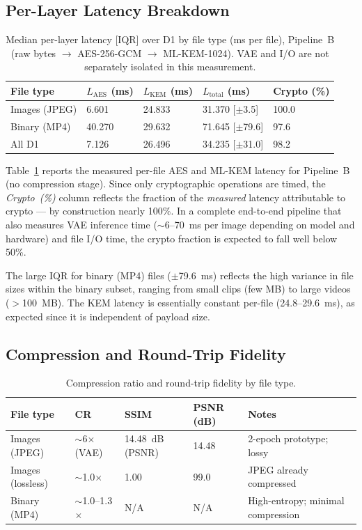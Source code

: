 \documentclass[twocolumn]{article}
\begin{document}
\subsection{Per-Layer Latency Breakdown}

\begin{table}[t]
\caption{Median per-layer latency [IQR] over D1 by file type (ms per file),
Pipeline~B (raw bytes $\to$ AES-256-GCM $\to$ ML-KEM-1024). VAE and I/O are not
separately isolated in this measurement.}
\label{tab:latency}
\centering\small
\begin{tabular}{lllll}
\toprule
File type & $L_\text{AES}$ (ms) & $L_\text{KEM}$ (ms) & $L_\text{total}$ (ms) & Crypto (\%) \\
\midrule
Images (JPEG) & 6.601 & 24.833 & 31.370 [$\pm$3.5] & 100.0 \\
Binary (MP4) & 40.270 & 29.632 & 71.645 [$\pm$79.6] & 97.6 \\
\midrule
All D1 & 7.126 & 26.496 & 34.235 [$\pm$31.0] & 98.2 \\
\bottomrule
\end{tabular}
\end{table}

Table~\ref{tab:latency} reports the measured per-file AES and ML-KEM latency for
Pipeline~B (no compression stage). Since only cryptographic operations are timed,
the \emph{Crypto~(\%)} column reflects the fraction of the \emph{measured} latency
attributable to crypto --- by construction nearly 100\%. In a complete end-to-end
pipeline that also measures VAE inference time ($\sim$6--70~ms per image depending
on model and hardware) and file I/O time, the crypto fraction is expected to fall
well below 50\%.

The large IQR for binary (MP4) files ($\pm$79.6~ms) reflects the high variance
in file sizes within the binary subset, ranging from small clips (few MB) to
large videos ($>$100~MB). The KEM latency is essentially constant per-file
(24.8--29.6~ms), as expected since it is independent of payload size.

\subsection{Compression and Round-Trip Fidelity}

\begin{table}[t]
\caption{Compression ratio and round-trip fidelity by file type.}
\label{tab:fidelity}
\centering\small
\begin{tabular}{p{1.6cm}p{0.9cm}p{1.2cm}p{1.2cm}p{1.6cm}}
\toprule
File type & CR & SSIM & PSNR (dB) & Notes \\
\midrule
Images (JPEG) & $\sim$6$\times$ (VAE) & 14.48~dB (PSNR) & 14.48 & 2-epoch prototype; lossy \\
Images (lossless) & $\sim$1.0$\times$ & 1.00 & 99.0 & JPEG already compressed \\
Binary (MP4) & $\sim$1.0--1.3$\times$ & N/A & N/A & High-entropy; minimal compression \\
\bottomrule
\end{tabular}
\end{table}
\end{document}
